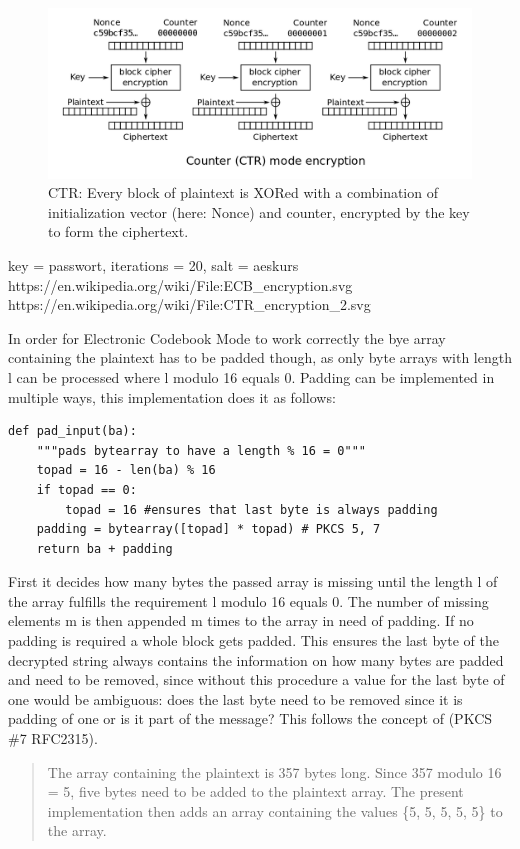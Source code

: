\begin{figure}
\centering
\includegraphics[scale = 0.3]{data/figures/CTR_encryption.png}
\caption{CTR: Every block of plaintext is XORed with a combination of initialization vector (here: Nonce) and counter, encrypted by the key to form the ciphertext.}
\end{figure}


key = passwort, iterations = 20, salt = aeskurs
https://en.wikipedia.org/wiki/File:ECB\_encryption.svg
https://en.wikipedia.org/wiki/File:CTR\_encryption\_2.svg

In order for Electronic Codebook Mode to work correctly the bye array
containing the plaintext has to be padded though, as only byte arrays
with length l can be processed where l modulo 16 equals 0. Padding can
be implemented in multiple ways, this implementation does it as follows:

\begin{lstlisting}
def pad_input(ba):
    """pads bytearray to have a length % 16 = 0"""
    topad = 16 - len(ba) % 16
    if topad == 0:
        topad = 16 #ensures that last byte is always padding
    padding = bytearray([topad] * topad) # PKCS 5, 7
    return ba + padding
\end{lstlisting}

First it decides how many bytes the passed array is missing until the
length l of the array fulfills the requirement l modulo 16 equals 0. The
number of missing elements m is then appended m times to the array in
need of padding. If no padding is required a whole block gets padded.
This ensures the last byte of the decrypted string always contains the
information on how many bytes are padded and need to be removed, since
without this procedure a value for the last byte of one would be
ambiguous: does the last byte need to be removed since it is padding of
one or is it part of the message? This follows the concept of (PKCS \#7
RFC2315).

\begin{quote}
The array containing the plaintext is 357 bytes long. Since 357 modulo 16 = 5,
five bytes need to be added to the plaintext array. The present
implementation then adds an array containing the values \{5, 5, 5, 5,
5\} to the array.
\end{quote}

